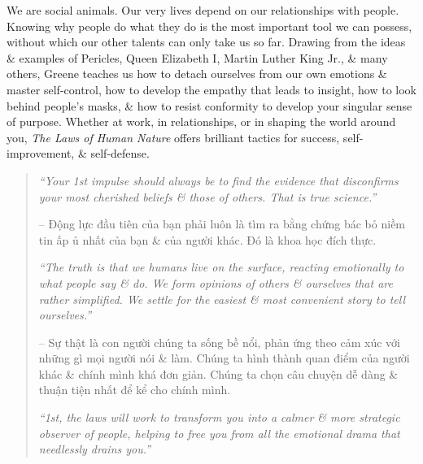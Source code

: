 \documentclass{article}
\begin{document}
\begin{enumerate}
	We are social animals. Our very lives depend on our relationships with people. Knowing why people do what they do is the most important tool we can possess, without which our other talents can only take us so far. Drawing from the ideas \& examples of {\sc Pericles, Queen Elizabeth I, Martin Luther King Jr.}, \& many others, {\sc Greene} teaches us how to detach ourselves from our own emotions \& master self-control, how to develop the empathy that leads to insight, how to look behind people's masks, \& how to resist conformity to develop your singular sense of purpose. Whether at work, in relationships, or in shaping the world around you, {\it The Laws of Human Nature} offers brilliant tactics for success, self-improvement, \& self-defense.
	\begin{quotation}
		{\it``Your 1st impulse should always be to find the evidence that disconfirms your most cherished beliefs \& those of others. That is true science.''}

		-- Động lực đầu tiên của bạn phải luôn là tìm ra bằng chứng bác bỏ niềm tin ấp ủ nhất của bạn \& của người khác. Đó là khoa học đích thực.

		{\it``The truth is that we humans live on the surface, reacting emotionally to what people say \& do. We form opinions of others \& ourselves that are rather simplified. We settle for the easiest \& most convenient story to tell ourselves.''}

		-- Sự thật là con người chúng ta sống bề nổi, phản ứng theo cảm xúc với những gì mọi người nói \& làm. Chúng ta hình thành quan điểm của người khác \& chính mình khá đơn giản. Chúng ta chọn câu chuyện dễ dàng \& thuận tiện nhất để kể cho chính mình.

		{\it``1st, the laws will work to transform you into a calmer \& more strategic observer of people, helping to free you from all the emotional drama that needlessly drains you.''}


\end{quotation}
\end{enumerate}
\end{document}
